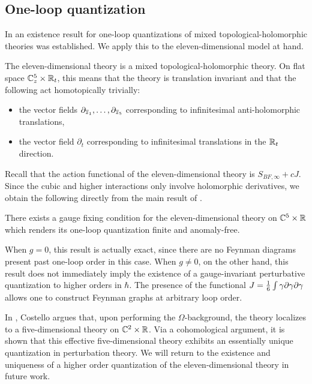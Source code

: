 
\subsection{One-loop quantization}

In \cite{GRWthf} an existence result for one-loop quantizations of mixed topological-holomorphic theories was established. 
We apply this to the eleven-dimensional model at hand. 

The eleven-dimensional theory is a mixed topological-holomorphic theory.
On flat space $\mathbb C^5_z \times \mathbb R_t$, this means that the theory is translation invariant and that the following act homotopically trivially:
\begin{itemize}
\item the vector fields $\partial_{\overline{z}_1}, \ldots, \partial_{\overline{z}_{5}}$ corresponding to infinitesimal anti-holomorphic translations,
\item the vector field $\partial_t$ corresponding to infinitesimal translations in the $\mathbb R_t$ direction. 
\end{itemize}

Recall that the action functional of the eleven-dimensional theory is $S_{BF, \infty} + c J$. 
Since the cubic and higher interactions only involve holomorphic derivatives, we obtain the following directly from the main result of \cite{GRWthf}. 

\begin{thm}
There exists a gauge fixing condition for the eleven-dimensional theory on $\mathbb C^5 \times \mathbb R$ which renders its one-loop quantization finite and anomaly-free. 
\end{thm} 

When $g=0$, this result is actually exact,
since there are no Feynman diagrams present past one-loop order in this case. 
When $g \ne 0$, on the other hand, this result does not immediately imply the existence of a gauge-invariant perturbative quantization to higher orders in $\hbar$. 
The presence of the functional $J = \frac16 \int \gamma \partial \gamma \partial \gamma$ allows one to construct Feynman graphs at arbitrary loop order. 


In \cite{CostelloM5}, Costello argues that, upon performing the $\Omega$-background, the theory localizes to a five-dimensional theory on $\mathbb C^2 \times \mathbb R$. 
Via a cohomological argument, it is shown that this effective five-dimensional theory exhibits an essentially unique quantization in perturbation theory. 
We will return to the existence and uniqueness of a higher order quantization of the eleven-dimensional theory in future work. 
